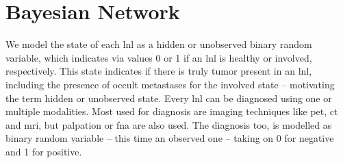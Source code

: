 \documentclass[\relativeRoot/main.tex]{subfiles}
\begin{document}
\section{Bayesian Network}
\label{sec:previous_work:bayesian_network}

We model the state of each \gls{lnl} as a hidden or unobserved binary random variable, which indicates via values 0 or 1 if an \gls{lnl} is healthy or involved, respectively. This state indicates if there is truly tumor present in an \gls{lnl}, including the presence of occult metastases for the involved state – motivating the term hidden or unobserved state. Every \gls{lnl} can be diagnosed using one or multiple modalities. Most used for diagnosis are imaging techniques like \gls{pet}, \gls{ct} and \gls{mri}, but palpation or \gls{fna} are also used. The diagnosis too, is modelled as binary random variable – this time an observed one – taking on 0 for negative and 1 for positive.
\end{document}
